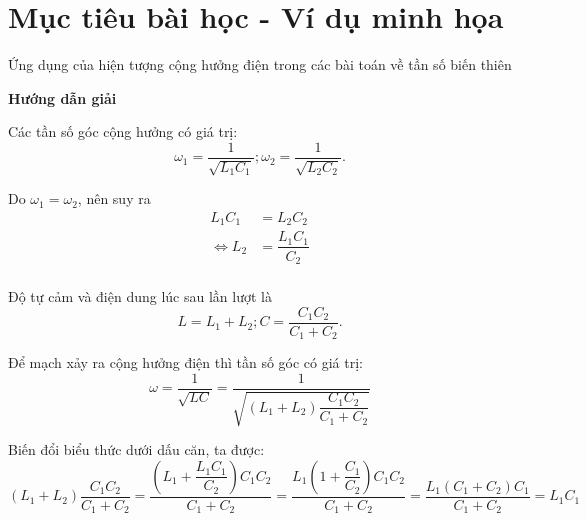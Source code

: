 \section{Mục tiêu bài học - Ví dụ minh họa}
\begin{dang}{Ứng dụng của hiện tượng cộng hưởng điện trong các bài toán về tần số biến thiên}
	{\begin{center}
			\textbf{Hướng dẫn giải}
		\end{center}
		
		Các tần số góc cộng hưởng có giá trị:
		\begin{equation*}
			\omega_1 = \dfrac{1}{\sqrt{L_1C_1}}; \omega_2 = \dfrac{1}{\sqrt{L_2C_2}}.
		\end{equation*}
		
		Do $\omega_1 = \omega_2$, nên suy ra
		\begin{align*}
			L_1C_1 &= L_2C_2\\
			\Leftrightarrow L_2&=\dfrac{L_1C_1}{C_2}\\
		\end{align*}
		
		Độ tự cảm và điện dung lúc sau lần lượt là
		\begin{equation*}
			L=L_1+L_2; C=\dfrac{C_1C_2}{C_1+C_2}.
		\end{equation*}
		
		Để mạch xảy ra cộng hưởng điện thì tần số góc có giá trị:
		\begin{equation*}
			\omega=\dfrac{1}{\sqrt{LC}}=\dfrac{1}{\sqrt{(L_1+L_2)\dfrac{C_1C_2}{C_1+C_2}}}
		\end{equation*}
		
		Biến đổi biểu thức dưới dấu căn, ta được:
		\begin{equation*}
			(L_1+L_2)\dfrac{C_1C_2}{C_1+C_2}=\dfrac{\left(L_1+\dfrac{L_1C_1}{C_2}\right)C_1C_2}{C_1+C_2}=\dfrac{L_1\left(1+\dfrac{C_1}{C_2}\right)C_1C_2}{C_1+C_2}=\dfrac{L_1(C_1+C_2)C_1}{C_1+C_2}=L_1C_1
		\end{equation*}
		
}
\end{dang}
